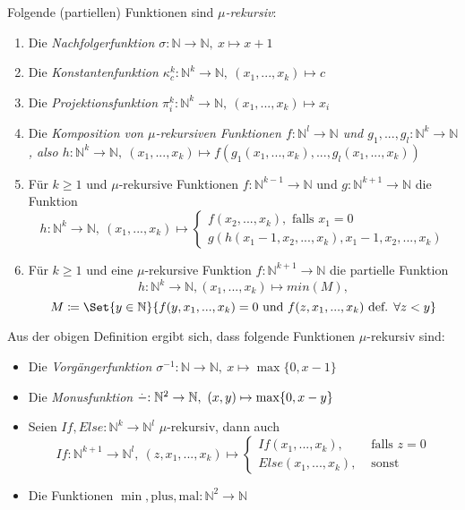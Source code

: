 \documentclass{cheat-sheet}
\newcommand{\monus}{\stackrel{{}^{\scriptstyle .}}{\smash{-}}}
\begin{document}
\begin{defn}
  Folgende (partiellen) Funktionen sind \emph{$\mu$-rekursiv}:
  \begin{enumerate}
    \item Die \it{Nachfolgerfunktion} $\sigma : \mathbb{N} \to \mathbb{N},\ x \mapsto x + 1$
    \item Die \it{Konstantenfunktion} $\kappa_{c}^{k} : \mathbb{N}^{k} \to \mathbb{N},\ (x_{1}, ..., x_{k}) \mapsto c$
    \item Die \it{Projektionsfunktion} $\pi_{i}^{k} : \mathbb{N}^{k} \to \mathbb{N},\ (x_{1}, ..., x_{k}) \mapsto x_{i}$
    \item Die \it{Komposition} von $\mu$-rekursiven Funktionen $f : \mathbb{N}^{l} \to \mathbb{N}$ und $g_{1}, ..., g_{l} : \mathbb{N}^{k} \to \mathbb{N}$, also $h : \mathbb{N}^{k} \to \mathbb{N},\ (x_{1}, ..., x_{k}) \mapsto f(g_{1}(x_{1}, ..., x_{k}), ..., g_{l}(x_{1}, ..., x_{k}))$
    \item Für $k \ge 1$ und $\mu$-rekursive Funktionen $f : \mathbb{N}^{k-1} \to \mathbb{N}$ und $g : \mathbb{N}^{k + 1} \to \mathbb{N}$ die Funktion
      { \scriptsize
      \[ h : \mathbb{N}^{k} \to \mathbb{N},\ (x_{1}, ..., x_{k}) \mapsto \begin{cases} f(x_{2}, ..., x_{k}), \text{ falls } x_{1} = 0 \\ g(h(x_{1} - 1, x_{2}, ..., x_{k}), x_{1} - 1, x_{2}, ..., x_{k}) \end{cases} \]
      }
    \item Für $k \ge 1$ und eine $\mu$-rekursive Funktion $f : \mathbb{N}^{k + 1} \to \mathbb{N}$ die partielle Funktion
      { \scriptsize
      \[ h : \mathbb{N}^{k} \to \mathbb{N}, (x_{1}, ..., x_{k}) \mapsto min(M), \]
      \[ M \coloneqq \Set{ y \in \mathbb{N} }{ f(y, x_1, ..., x_k) = 0 \text{ und } f(z, x_1, ..., x_k) \text{ def. } \forall z < y } \]
      }
  \end{enumerate}
\end{defn}

\begin{bem}
Aus der obigen Definition ergibt sich, dass folgende Funktionen $\mu$-rekursiv sind:
\begin{itemize}
  \item Die \it{Vorgängerfunktion} $\sigma^{-1} : \mathbb{N} \to \mathbb{N},\ x \mapsto \max\{0, x - 1\}$
  \item Die \it{Monusfunktion} $\monus : \mathbb{N}^{2} \to \mathbb{N},\ (x, y) \mapsto \max\{0, x - y\}$
  \item Seien $If, Else : \mathbb{N}^k \to \mathbb{N}^{l}$ $\mu$-rekursiv, dann auch
    \[ If : \mathbb{N}^{k + 1} \to \mathbb{N}^{l},\ (z, x_1, ..., x_k) \mapsto \begin{cases}If(x_1, ..., x_k), & \text{ falls } z = 0\\Else(x_1, ..., x_k), & \text{ sonst }\end{cases} \]
  \item Die Funktionen $\min, \mathrm{plus}, \mathrm{mal} : \mathbb{N}^2 \to \mathbb{N}$

\end{itemize}
\end{bem}
\end{document}
